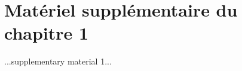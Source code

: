 
\francais   

\chapter*{Matériel supplémentaire du chapitre 1}

...supplementary material 1...

\endinput
